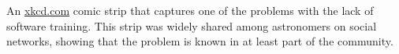 \label{fig:xkcd}

An \href{https://xkcd.com/1513/}{xkcd.com} comic strip that captures one of the problems with the lack of software training.  This strip was widely shared among astronomers on social networks, showing that the problem is known in at least part of the community.
  
  
  
  
  
  
  
  
  
  
  
  